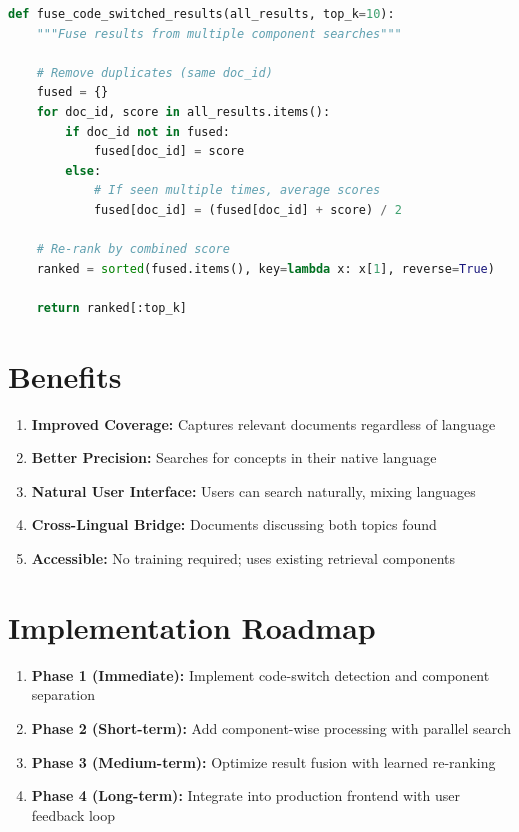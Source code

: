 \documentclass[12pt,a4paper]{report}
\begin{document}
\begin{lstlisting}[language=Python, caption=Result Fusion]
def fuse_code_switched_results(all_results, top_k=10):
    """Fuse results from multiple component searches"""
    
    # Remove duplicates (same doc_id)
    fused = {}
    for doc_id, score in all_results.items():
        if doc_id not in fused:
            fused[doc_id] = score
        else:
            # If seen multiple times, average scores
            fused[doc_id] = (fused[doc_id] + score) / 2
    
    # Re-rank by combined score
    ranked = sorted(fused.items(), key=lambda x: x[1], reverse=True)
    
    return ranked[:top_k]
\end{lstlisting}

\section{Benefits}

\begin{enumerate}
    \item \textbf{Improved Coverage:} Captures relevant documents regardless of language
    \item \textbf{Better Precision:} Searches for concepts in their native language
    \item \textbf{Natural User Interface:} Users can search naturally, mixing languages
    \item \textbf{Cross-Lingual Bridge:} Documents discussing both topics found
    \item \textbf{Accessible:} No training required; uses existing retrieval components
\end{enumerate}

\section{Implementation Roadmap}

\begin{enumerate}
    \item \textbf{Phase 1 (Immediate):} Implement code-switch detection and component separation
    \item \textbf{Phase 2 (Short-term):} Add component-wise processing with parallel search
    \item \textbf{Phase 3 (Medium-term):} Optimize result fusion with learned re-ranking
    \item \textbf{Phase 4 (Long-term):} Integrate into production frontend with user feedback loop
\end{enumerate}
\end{document}
